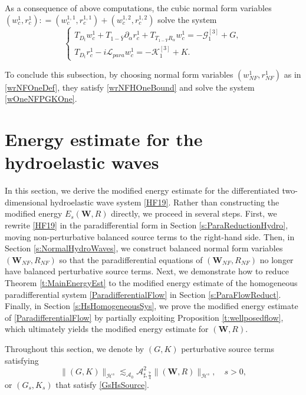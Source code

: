 \documentclass[10pt]{amsart}
\theoremstyle{remark}
\theoremstyle{definition}
\numberwithin{equation}{section}
\newcommand{\p}{\partial}
\renewcommand{\H}{{\mathcal H }}
\newcommand{\al}{\alpha}
\newcommand{\bw}{\mathbf{W}}
\newcommand{\ASSharp}{{\mathcal{A}_{\sharp,\frac{7}{4}}^2}}
\begin{document}
As a consequence of above computations,  the cubic normal form variables $(w^1_c, r^1_c): = (w^{1,1}_c, r^{1,1}_c) + (w^{1,2}_c, r^{1,2}_c)$ solve the system 
\begin{equation*} 
\begin{cases}
T_{D_t}w^1_c+T_{1-\bar{Y}}\p_\al r^1_c+T_{T_{1-\bar{Y}}R_{\al}}w^1_c= - \mathcal{G}_1^{[3]} + G,\\
T_{D_t}r^1_c-i\mathcal{L}_{para}w^1_c=- \mathcal{K}_1^{[3]} +K.
\end{cases}
\end{equation*}

To conclude this subsection, by choosing normal form variables $(w_{NF}^1, r_{NF}^1)$ as in \eqref{wrNFOneDef}, they satisfy \eqref{wrNFHOneBound} and solve the system \eqref{wOneNFPGKOne}.


\section{Energy estimate for the hydroelastic waves}  \label{s:Energy}
In this section, we derive the modified energy estimate for the differentiated two-dimensional hydroelastic wave system \eqref{HF19}.
Rather than constructing the modified energy $E_s(\mathbf{W},R)$ directly, we proceed in several steps.
First, we rewrite \eqref{HF19} in the paradifferential form in Section \ref{s:ParaReductionHydro}, moving non-perturbative balanced source terms to the right-hand side.
Then, in Section \ref{s:NormalHydroWaves}, we construct balanced normal form variables $(\bw_{NF}, R_{NF})$ so that the paradifferential equations of $(\bw_{NF}, R_{NF})$ no longer have balanced perturbative source terms.
Next, we demonstrate how to reduce Theorem \ref{t:MainEnergyEst} to  the modified energy estimate of the homogeneous paradifferential system \eqref{ParadifferentialFlow} in Section \ref{s:ParaFlowReduct}.
Finally, in Section \ref{s:HsHomogeneousSys}, we  prove the modified energy estimate of  \eqref{ParadifferentialFlow} by partially exploiting Proposition \ref{t:wellposedflow}, which ultimately yields the modified energy estimate for $(\bw, R)$. 

Throughout this section, we denote by $(G, K)$ perturbative source terms satisfying
\begin{equation}  \label{GKHsPerturb}
    \|(G,K)\|_{\H^s} \lesssim_{\mathcal{A}_0} \ASSharp \|(\bw, R)\|_{\H^s}, \quad s > 0,
\end{equation}
or $(G_s, K_s)$ that satisfy \eqref{GsHsSource}.
\end{document}
